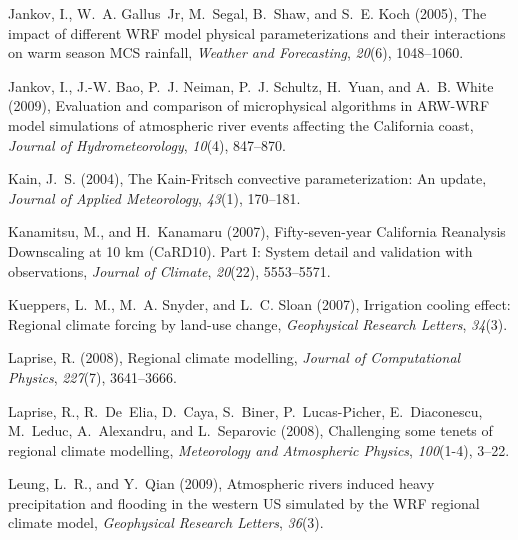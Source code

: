 \documentclass[ms,draft]{agutex}   %
\begin{document}
\begin{article}
\begin{thebibliography}{84}
Jankov, I., W.~A. Gallus~Jr, M.~Segal, B.~Shaw, and S.~E. Koch (2005), {The
  impact of different WRF model physical parameterizations and their
  interactions on warm season MCS rainfall}, \textit{Weather and Forecasting},
  \textit{20}(6), 1048--1060.

Jankov, I., J.-W. Bao, P.~J. Neiman, P.~J. Schultz, H.~Yuan, and A.~B. White
  (2009), {Evaluation and comparison of microphysical algorithms in ARW-WRF
  model simulations of atmospheric river events affecting the California
  coast}, \textit{Journal of Hydrometeorology}, \textit{10}(4), 847--870.

Kain, J.~S. (2004), {The Kain-Fritsch convective parameterization: An update},
  \textit{Journal of Applied Meteorology}, \textit{43}(1), 170--181.

Kanamitsu, M., and H.~Kanamaru (2007), {Fifty-seven-year California Reanalysis
  Downscaling at 10 km (CaRD10). Part I: System detail and validation with
  observations}, \textit{Journal of Climate}, \textit{20}(22), 5553--5571.

Kueppers, L.~M., M.~A. Snyder, and L.~C. Sloan (2007), Irrigation cooling
  effect: Regional climate forcing by land-use change, \textit{Geophysical
  Research Letters}, \textit{34}(3).

Laprise, R. (2008), Regional climate modelling, \textit{Journal of
  Computational Physics}, \textit{227}(7), 3641--3666.

Laprise, R., R.~De~Elia, D.~Caya, S.~Biner, P.~Lucas-Picher, E.~Diaconescu,
  M.~Leduc, A.~Alexandru, and L.~Separovic (2008), Challenging some tenets of
  regional climate modelling, \textit{Meteorology and Atmospheric Physics},
  \textit{100}(1-4), 3--22.

Leung, L.~R., and Y.~Qian (2009), {Atmospheric rivers induced heavy
  precipitation and flooding in the western US simulated by the WRF regional
  climate model}, \textit{Geophysical Research Letters}, \textit{36}(3).


\end{thebibliography}
\end{article}
\end{document}
